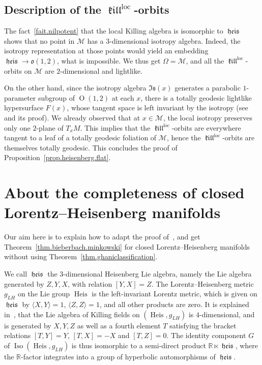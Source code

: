 \documentclass[11pt]{article}
\theoremstyle{definition}
\numberwithin{equation}{section}
\numberwithin{figure}{section}
\numberwithin{table}{section}
\DeclareMathOperator{\Iso}{Iso}
\DeclareMathOperator{\Omp}{O}%
\DeclareMathOperator{\loc}{loc}
\DeclareMathOperator{\kil}{{\mathfrak{kill}}}
\newcommand{\kiloc}{\kil^{\loc}}
\DeclareMathOperator{\heis}{{\mathfrak{heis}}}
\DeclareMathOperator{\Heis}{Heis}
\newcommand{\calm}{\mathcal{M}}
\newcommand*\RR{\mathbb{R}}
\newcommand{\oo}{{\mathfrak{o}}}
\begin{document}
\subsection{Description of the \texorpdfstring{$\kiloc$}{kiloc}-orbits}

The fact~\ref{fait.nilpotent} that the local Killing algebra is isomorphic to $\heis$ shows that no point in $\calm$ has a $3$-dimensional isotropy algebra. Indeed, the isotropy representation at those points would yield an embedding $\heis \to \oo(1,2)$, what is impossible. We thus get $\Omega=\calm$, and all the $\kiloc$-orbits on $\calm$ are $2$-dimensional and lightlike.

On the other hand, since the isotropy algebra ${\mathfrak{Is}}(x)$ generates a parabolic $1$-parameter subgroup of $\Omp(1,2)$ at each $x$, there is a totally geodesic lightlike hypersurface $F(x)$, whose tangent space is left invariant by the isotropy (see~\cite[Lemma~3.5]{sorin.ghani} and its proof). We already observed that at $x \in \calm$, the local isotropy preserves only one $2$-plane of $T_xM$. This implies that the $\kiloc$-orbits are everywhere tangent to a leaf of a totally geodesic foliation of $\calm$, hence the $\kiloc$-orbits are themselves totally geodesic. This concludes the proof of Proposition~\ref{prop.heisenberg.flat}.

\section{About the completeness of closed Lorentz--Heisenberg manifolds}\label{ann.completeness}

Our aim here is to explain how to adapt the proof of~\cite[Proposition~8.1]{sorin.ghani}, and get Theorem~\ref{thm.bieberbach.minkowski} for closed Lorentz--Heisenberg manifolds without using Theorem~\ref{thm.ghaniclassification}.

We call $\heis$ the $3$-dimensional Heisenberg Lie algebra, namely the Lie algebra generated by $Z,Y,X$, with relation $[Y,X]=Z$. The Lorentz--Heisenberg metric $g_{LH}$ on the Lie group $\Heis$ is the left-invariant Lorentz metric, which is given on $\heis$ by $\langle X,Y\rangle=1$, $\langle Z,Z\rangle=1$, and all other products are zero. It is explained in~\cite[Section~4.1]{sorin.ghani}, that the Lie algebra of Killing fields on $(\Heis,g_{LH})$ is $4$-dimensional, and is generated by $X,Y,Z$ as well as a fourth element $T$ satisfying the bracket relations $[T,Y]=Y$, $[T,X]=-X$ and $[T,Z]=0$. The identity component $G$ of $\Iso(\Heis, g_{LH})$ is thus isomorphic to a semi-direct product $\RR \ltimes \heis$, where the $\RR$-factor integrates into a group of hyperbolic automorphisms of $\heis$.
\end{document}
